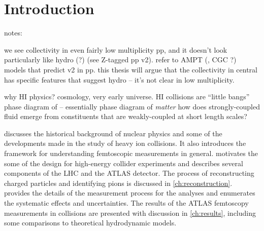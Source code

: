 \chapter{Introduction}
\label{ch:intro}


 notes:

 we see collectivity in even fairly low multiplicity pp, and it doesn't look particularly like hydro (?) (see Z-tagged pp v2). refer to AMPT (, CGC ?) models that predict v2 in pp. this thesis will argue that the collectivity in central \pPb has specific features that suggest hydro -- it's not clear in low multiplicity.

 
why HI physics? %
cosmology, very early universe. HI collisions are ``little bangs''
phase diagram of \qcd -- essentially phase diagram of \emph{matter}
how does strongly-coupled fluid emerge from constituents that are weakly-coupled at short length scales?


 discusses the historical background of nuclear physics and some of the developments made in the study of heavy ion collisions.
It also introduces the framework for understanding femtoscopic measurements in general.
 motivates the some of the design for high-energy collider experiments and describes several components of the \ac{LHC} and the ATLAS detector.
The process of reconstructing charged particles and identifying pions is discussed in \cref{ch:reconstruction}.
 provides the details of the measurement process for the analyses and enumerates the systematic effects and uncertainties.
The results of the ATLAS femtoscopy measurements in \pPb collisions are presented with discussion in \cref{ch:results}, including some comparisons to theoretical hydrodynamic models.
